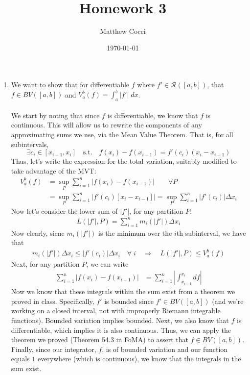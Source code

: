 \documentclass[12pt]{article}
\author{Matthew Cocci}
\title{\textbf{Homework 3}}
\date{\today}
\theoremstyle{plain}
\theoremstyle{definition}
\theoremstyle{remark}
\begin{document}
\maketitle 

\begin{enumerate}
    
\item We want to show that for differentiable $f$ where $f'\in\mathscr{R}([a,b])$, that $f\in BV([a,b])$ and $V^b_a(f) = \int^b_a |f'| \; dx$. 
\\
\\
We start by noting that since $f$ is differentiable, we know that $f$ is continuous. This will allow us to rewrite the components of any approximating sums we use, via the Mean Value Theorem. That is, for all subintervals, 
\[ 
    \exists c_i \in [x_{i-1}, x_i] \quad \text{s.t.} \quad
    f(x_i) - f(x_{i-1}) = f'(c_i) (x_{i} - x_{i-1})
\]
Thus, let's write the expression for the total variation, suitably modified to take advantage of the MVT:
\begin{align*}
    V^b_a(f) &= \sup_P \sum_{i=1}^n |f(x_i) - f(x_{i-1})| \qquad \forall P \\
    &= \sup_P \sum_{i=1}^n |f'(c_i)[x_i-x_{i-1}]| =\sup_P
    \sum_{i=1}^n |f'(c_i)| \Delta x_i
\end{align*}
Now let's consider the lower sum of $|f'|$, for any partition $P$:
\begin{align*}
    L(|f'|,P) = \sum_{i=1}^n m_i(|f'|) \Delta x_i 
\end{align*}
Now clearly, sicne $m_i(|f'|)$ is the minimum over the $i$th subinterval, we have that 
\begin{align*}
    m_i(|f'|) \Delta x_i  \leq |f'(c_i)| \Delta x_i \quad \forall \; i
    \quad \Rightarrow \quad L(|f'|,P) \leq V^b_a(f)
\end{align*}
Next, for any partition $P$, we can write
\begin{align}
    \label{q1.sum}
    \sum^n_{i=1} |f(x_i) - f(x_{i-1})| &= 
        \sum^n_{i=1} \left\lvert \int^{x_i}_{x_{i-1}} df 
        \right\rvert 
\end{align}
Now we know that these integrals within the sum exist from a theorem we proved in class. Specifically, $f'$ is bounded since $f'\in BV([a,b])$ (and we're working on a closed interval, not with improperly Riemann integrable functions). Bounded variation implies bounded. Next, we also know that $f$ is differentiable, which implies it is also continuous. Thus, we can apply the theorem we proved (Theorem 54.3 in FoMA) to assert that $f\in BV([a,b])$. Finally, since our integrator, $f$, is of bounded variation and our function equals $1$ everywhere (which is continuous), we know that the integrals in the sum exist.


\end{enumerate}
\end{document}
